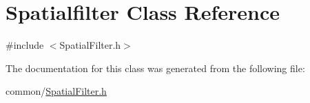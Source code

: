 \hypertarget{classSpatialfilter}{
\section{Spatialfilter Class Reference}
\label{classSpatialfilter}
}


{\ttfamily \#include $<$SpatialFilter.h$>$}



The documentation for this class was generated from the following file:\begin{DoxyCompactItemize}
\item 
common/\hyperlink{SpatialFilter_8h}{SpatialFilter.h}\end{DoxyCompactItemize}
